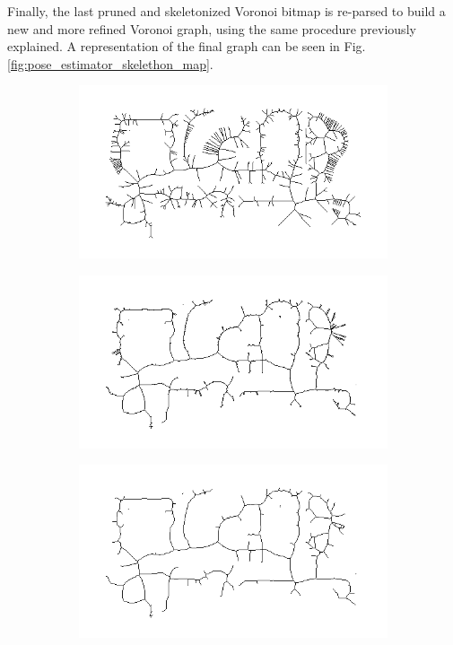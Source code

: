 Finally, the last pruned and skeletonized Voronoi bitmap is re-parsed to build a new and more refined Voronoi graph, using the same procedure previously explained. A representation of the final graph can be seen in Fig. \ref{fig:pose_estimator_skelethon_map}. 
 
\begin{figure}[h!]
	\centering
	\begin{subfigure}[b]{0.49\linewidth}
		\centering
		\includegraphics[width=\textwidth]{images/pose_estimator_bitmap_voronoi.png}
		\caption{}
		\label{fig:pose_estimator_bitmap}
	\end{subfigure}
	\hfil
	\begin{subfigure}[b]{0.49\linewidth}
		\centering
		\includegraphics[width=\textwidth]{images/pose_estimator_pruned_lines.png}
		\caption{}
		\label{fig:pose_estimator_pruned_lines}
	\end{subfigure}
	\newline
	\begin{subfigure}[b]{0.49\linewidth}
		\centering
		\includegraphics[width=\textwidth]{images/pose_estimator_skelethonization.png}

\end{subfigure}
\end{figure}

